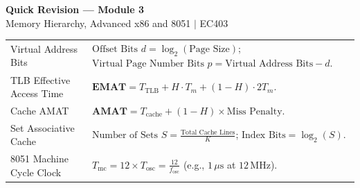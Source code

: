 \documentclass[12pt,a4paper]{article}
\renewcommand{\arraystretch}{1.45}
\begin{document}
\newpage
\begin{center}
  {\large\bfseries\color{myred} Quick Revision --- Module 3}\\[3pt]
  {\small\color{mydark} Memory Hierarchy, Advanced x86 and 8051 $|$ EC403}
\end{center}
\noindent{\color{myred}\rule{\linewidth}{1.2pt}}\vspace{4pt}

\begin{tcolorbox}[formulabox, title={Key Formulas at a Glance}]
\renewcommand{\arraystretch}{1.35}
\noindent\begin{tabularx}{\linewidth}{B{4.5cm}Y}
Virtual Address Bits & $\text{Offset Bits } d = \log_2(\text{Page Size})$; $\text{Virtual Page Number Bits } p = \text{Virtual Address Bits} - d$. \\
TLB Effective Access Time & $\mathbf{EMAT} = T_{\mathrm{TLB}} + H \cdot T_m + (1-H) \cdot 2T_m$. \\
Cache AMAT & $\mathbf{AMAT} = T_{\mathrm{cache}} + (1 - H) \times \text{Miss Penalty}$. \\
Set Associative Cache & $\text{Number of Sets } S = \frac{\text{Total Cache Lines}}{K}$; $\text{Index Bits} = \log_2(S)$. \\
8051 Machine Cycle Clock & $T_{\mathrm{mc}} = 12 \times T_{\mathrm{osc}} = \frac{12}{f_{\mathrm{osc}}}$ (e.g., $1\,\mu\mathrm{s}$ at $12\,\mathrm{MHz}$). \\
\end{tabularx}\par
\end{tcolorbox}
\end{document}
